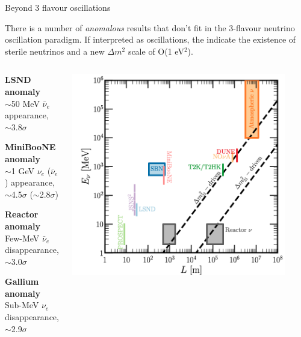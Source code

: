 \begin{frame}{Beyond 3 flavour oscillations}

{\small
  There is a number of {\em anomalous} results that don't fit in the
  3-flavour neutrino oscillation paradigm. If interpreted as oscillations,
  the indicate the existence of sterile neutrinos and a new $\Delta m^2$ scale
  of O(1 eV$^2$). \\
}

  \begin{columns}
    \begin{column}{0.45\textwidth}
      \begin{itemize}
      {\small
        \item {\bf LSND anomaly}\\
           $\sim$50 MeV $\bar{\nu}_{e}$ appearance,\\ $\sim$3.8$\sigma$
        \item {\bf MiniBooNE anomaly}\\
           $\sim$1 GeV $\nu_{e}$ ($\bar{\nu}_{e}$) appearance,\\ $\sim$4.5$\sigma$ ($\sim$2.8$\sigma$)
        \item {\bf Reactor anomaly}\\
           Few-MeV $\bar{\nu}_{e}$ disappearance,\\ $\sim$3.0$\sigma$
        \item {\bf Gallium anomaly}\\
           Sub-MeV $\nu_{e}$ disappearance,\\ $\sim$2.9$\sigma$
      }
      \end{itemize}
    \end{column}
    \begin{column}{0.55\textwidth}
      \includegraphics[width=0.90\textwidth]{./images/osc101/expt_L_E}
    \end{column}
  \end{columns}


\end{frame}
